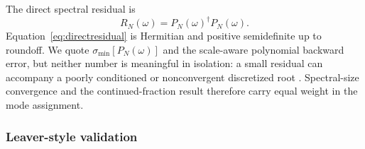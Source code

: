 \documentclass[12pt,a4paper]{article}
\begin{document}
The direct spectral residual is
\color{black}
\begin{equation}
R_N(\omega)=P_N(\omega)^\dagger P_N(\omega).
\label{eq:directresidual}
\end{equation}
\color{blue}
Equation~\eqref{eq:directresidual} is Hermitian and positive semidefinite up to
roundoff. We quote \(\sigma_{\min}[P_N(\omega)]\) and the scale-aware polynomial
backward error, but neither number is meaningful in isolation: a small residual
can accompany a poorly conditioned or nonconvergent discretized root
\cite{Sadkane2023}. Spectral-size convergence and the continued-fraction result
therefore carry equal weight in the mode assignment.
\color{black}

\subsubsection{Leaver-style validation}
\end{document}
